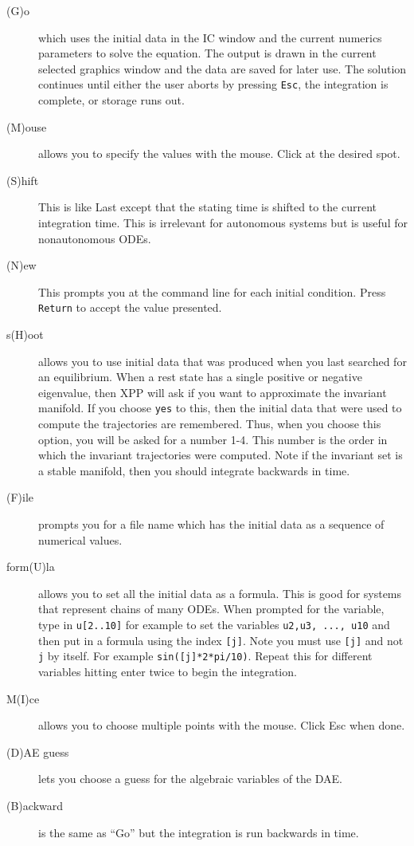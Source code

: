 \documentclass{article}
\begin{document}
\begin{description}
\begin{description}
\item[(G)o] which uses the initial data in the IC window and the current
 numerics parameters to solve the equation.  The output is drawn in the
 current selected graphics window and the data are saved for later use.  The
 solution continues until either the user aborts by pressing {\tt Esc}, the
 integration is complete, or storage runs out.
\item[(M)ouse]  allows you to specify the values with the mouse.  Click at the
 desired spot.
\item[(S)hift] This is like Last except that the stating time is shifted to the 
current integration time.  This is irrelevant for autonomous systems but is
 useful for nonautonomous ODEs.
\item[(N)ew] This prompts you at the command line for each initial condition.
 Press {\tt Return} to accept the value presented.
\item[s(H)oot] allows you to use initial data that was produced when
you last searched for an equilibrium.  When a rest state has a single
positive or negative eigenvalue, then XPP will ask if you want to
approximate the invariant manifold.  If you choose {\tt yes} to this,
then the initial data that were used to compute the trajectories are
remembered.  Thus, when you choose this option, you will be asked for
a number 1-4.  This number is the order in which the invariant
trajectories were computed.  Note if the invariant set is a stable
manifold, then you should integrate backwards in time.
\item[(F)ile] prompts you for a file name which has the initial data
as a sequence of numerical values.
\item[form(U)la] allows you to set all the initial data as a
formula. This is good for systems that represent chains of many ODEs.
When prompted for the variable, type in {\tt u[2..10]} for example to
set the variables {\tt u2,u3, ..., u10} and then put in a formula
using the index {\tt [j]}. Note you must use {\tt [j]} and not {\tt j}
by itself. For example {\tt sin([j]*2*pi/10)}. Repeat this for
different variables hitting enter twice to begin the integration.
\item[M(I)ce] allows you to choose multiple points with the
mouse. Click Esc when done.
\item[(D)AE guess] lets you choose a guess for the algebraic variables of
the DAE.
\item[(B)ackward] is the same as ``Go'' but the integration is run
backwards in time.
  

\end{description}
\end{description}
\end{document}
